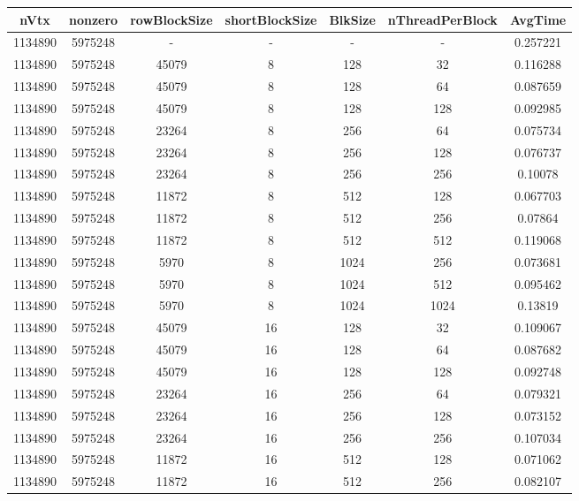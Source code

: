 \documentclass[9pt]{article}
\begin{document}
\SetBgPosition{0.25cm,-5.0cm}
\begin{tabular}{|c|c|c|c|c|c|c| }  
\hline
nVtx  & nonzero  & rowBlockSize  & shortBlockSize  & BlkSize  & nThreadPerBlock  & AvgTime \\
\hline
1134890  & 5975248  &  -  & -  & -  & -  &0.257221 \\
\hline
1134890  & 5975248  & 45079  & 8  & 128  & 32  & 0.116288 \\
\hline
1134890  & 5975248  & 45079  & 8  & 128  & 64  & 0.087659 \\
\hline
1134890  & 5975248  & 45079  & 8  & 128  & 128  & 0.092985 \\
\hline
1134890  & 5975248  & 23264  & 8  & 256  & 64  & 0.075734 \\
\hline
1134890  & 5975248  & 23264  & 8  & 256  & 128  & 0.076737 \\
\hline
1134890  & 5975248  & 23264  & 8  & 256  & 256  & 0.10078 \\
\hline
1134890  & 5975248  & 11872  & 8  & 512  & 128  & 0.067703 \\
\hline
1134890  & 5975248  & 11872  & 8  & 512  & 256  & 0.07864 \\
\hline
1134890  & 5975248  & 11872  & 8  & 512  & 512  & 0.119068 \\
\hline
1134890  & 5975248  & 5970  & 8  & 1024  & 256  & 0.073681 \\
\hline
1134890  & 5975248  & 5970  & 8  & 1024  & 512  & 0.095462 \\
\hline
1134890  & 5975248  & 5970  & 8  & 1024  & 1024  & 0.13819 \\
\hline
1134890  & 5975248  & 45079  & 16  & 128  & 32  & 0.109067 \\
\hline
1134890  & 5975248  & 45079  & 16  & 128  & 64  & 0.087682 \\
\hline
1134890  & 5975248  & 45079  & 16  & 128  & 128  & 0.092748 \\
\hline
1134890  & 5975248  & 23264  & 16  & 256  & 64  & 0.079321 \\
\hline
1134890  & 5975248  & 23264  & 16  & 256  & 128  & 0.073152 \\
\hline
1134890  & 5975248  & 23264  & 16  & 256  & 256  & 0.107034 \\
\hline
1134890  & 5975248  & 11872  & 16  & 512  & 128  & 0.071062 \\
\hline
1134890  & 5975248  & 11872  & 16  & 512  & 256  & 0.082107 \\

\end{tabular}
\end{document}
